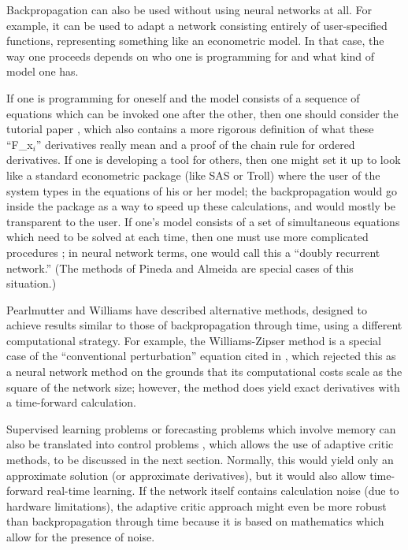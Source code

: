 \documentclass[journal]{IEEEtran} %
\begin{document}
Backpropagation can also be used without using neural networks at all. For example, it can be used to adapt a network consisting entirely of user-specified functions, representing something like an econometric model. In that case, the way one proceeds depends on who one is programming for and what kind of model one has.

If one is programming for oneself and the model consists of a sequence of equations which can be invoked one after the other, then one should consider the tutorial paper \cite{Werbos:1987b}, which also contains a more rigorous definition of what these ``F\_x$_i$'' derivatives really mean and a proof of the chain rule for ordered derivatives. If one is developing a tool for others, then one might set it up to look like a standard econometric package (like SAS or Troll) where the user of the system types in the equations of his or her model; the backpropagation would go inside the package as a way to speed up these calculations, and would mostly be transparent to the user. If one's model consists of a set of simultaneous equations which need to be solved at each time, then one must use more complicated procedures \cite{Werbos:1988}; in neural network terms, one would call this a ``doubly recurrent network.'' (The methods of Pineda \cite{Pineda:1987} and Almeida \cite{Almeida:1987} are special cases of this situation.)

Pearlmutter \cite{Pearlmutter:1989} and Williams \cite{Williams:1990} have described alternative methods, designed to achieve results similar to those of backpropagation through time, using a different computational strategy. For example, the Williams-Zipser method is a special case of the ``conventional perturbation'' equation cited in \cite{Werbos:1982}, which rejected this as a neural network method on the grounds that its computational costs scale as the square of the network size; however, the method does yield exact derivatives with a time-forward calculation.

Supervised learning problems or forecasting problems which involve memory can also be translated into control problems \cite{Werbos:1988, Werbos:1987c}, which allows the use of adaptive critic methods, to be discussed in the next section. Normally, this would yield only an approximate solution (or approximate derivatives), but it would also allow time-forward real-time learning. If the network itself contains calculation noise (due to hardware limitations), the adaptive critic approach might even be more robust than backpropagation through time because it is based on mathematics which allow for the presence of noise.
\end{document}
